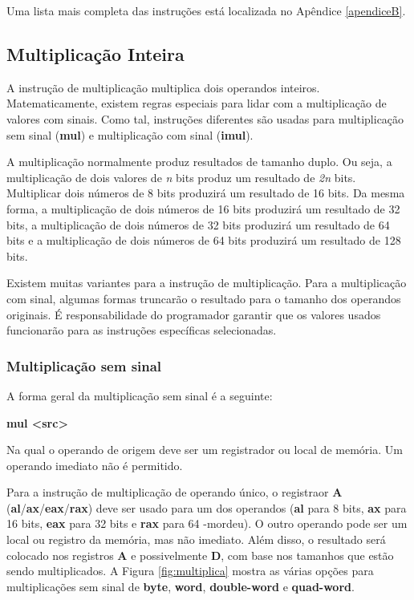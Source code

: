 Uma lista mais completa das instruções está localizada no Apêndice \ref{apendiceB}.

\subsection{Multiplicação Inteira}
A instrução de multiplicação multiplica dois operandos inteiros. Matematicamente, existem regras especiais para lidar com a multiplicação de valores com sinais. Como tal, instruções diferentes são usadas para multiplicação sem sinal (\textbf{mul}) e multiplicação com sinal (\textbf{imul}).

A multiplicação normalmente produz resultados de tamanho duplo. Ou seja, a multiplicação de dois valores de \textit{n} bits produz um resultado de \textit{2n} bits. Multiplicar dois números de 8 bits produzirá um resultado de 16 bits. Da mesma forma, a multiplicação de dois números de 16 bits produzirá um resultado de 32 bits, a multiplicação de dois números de 32 bits produzirá um resultado de 64 bits e a multiplicação de dois números de 64 bits produzirá um resultado de 128 bits.

Existem muitas variantes para a instrução de multiplicação. Para a multiplicação com sinal, algumas formas truncarão o resultado para o tamanho dos operandos originais. É responsabilidade do programador garantir que os valores usados funcionarão para as instruções específicas selecionadas.

\subsubsection{Multiplicação sem sinal}
A forma geral da multiplicação sem sinal é a seguinte:
\begin{center}
	\textbf{mul <src>}
\end{center}

Na qual o operando de origem deve ser um registrador ou local de memória. Um operando imediato não é permitido.

Para a instrução de multiplicação de operando único, o registraor \textbf{A} (\textbf{al}/\textbf{ax}/\textbf{eax}/\textbf{rax}) deve ser usado para um dos operandos (\textbf{al} para 8 bits, \textbf{ax} para 16 bits, \textbf{eax} para 32 bits e \textbf{rax} para 64 -mordeu). O outro operando pode ser um local ou registro da memória, mas não imediato. Além disso, o resultado será colocado nos registros \textbf{A} e possivelmente \textbf{D}, com base nos tamanhos que estão sendo multiplicados. A Figura \ref{fig:multiplica} mostra as várias opções para multiplicações sem sinal de \textbf{byte}, \textbf{word}, \textbf{double-word} e \textbf{quad-word}.

